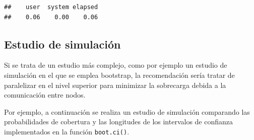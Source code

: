 \documentclass[
]{book}
\theoremstyle{break}
\theoremstyle{nonumberplain}
\begin{document}
\begin{verbatim}
##    user  system elapsed 
##    0.06    0.00    0.06
\end{verbatim}

\hypertarget{estudio-sim-boot}{%
\subsection{Estudio de simulación}\label{estudio-sim-boot}}

Si se trata de un estudio más complejo, como por ejemplo un estudio de simulación en el que se emplea bootstrap, la recomendación sería tratar de paralelizar en el nivel superior para minimizar la sobrecarga debida a la comunicación entre nodos.

Por ejemplo, a continuación se realiza un estudio de simulación comparando las probabilidades de cobertura y las longitudes de los intervalos de confianza implementados en la función \texttt{boot.ci()}.
\end{document}
